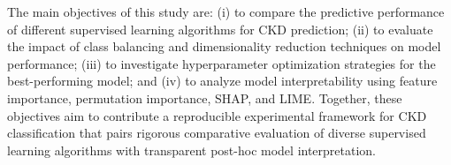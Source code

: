 The main objectives of this study are: (i) to compare the predictive performance
of different supervised learning algorithms for CKD prediction; (ii) to evaluate
the impact of class balancing and dimensionality reduction techniques on model
performance; (iii) to investigate hyperparameter optimization strategies for the
best-performing model; and (iv) to analyze model interpretability using feature
importance, permutation importance, SHAP, and LIME. Together, these objectives
aim to contribute a reproducible experimental framework for CKD classification
that pairs rigorous comparative evaluation of diverse supervised learning
algorithms with transparent post-hoc model interpretation.
